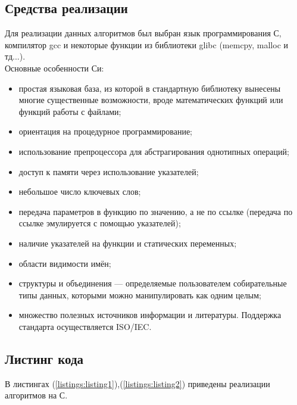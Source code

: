 \documentclass[a4paper,12pt]{article}
\begin{document}
\newpage
\subsection{Средства реализации}
Для реализации данных алгоритмов был выбран язык программирования С, компилятор gcc и некоторые функции из библиотеки glibc (memcpy, malloc и тд...). \\
Основные особенности Си:
\begin{itemize}
\item простая языковая база, из которой в стандартную библиотеку вынесены многие существенные возможности, вроде математических функций или функций работы с файлами;
\item ориентация на процедурное программирование;
\item использование препроцессора для абстрагирования однотипных операций;
\item доступ к памяти через использование указателей;
\item небольшое число ключевых слов;
\item передача параметров в функцию по значению, а не по ссылке (передача по ссылке эмулируется с помощью указателей);
\item наличие указателей на функции и статических переменных;
\item области видимости имён;
\item структуры и объединения — определяемые пользователем собирательные типы данных, которыми можно манипулировать как одним целым;
\item множество полезных источников информации и литературы. Поддержка стандарта осуществляется ISO/IEC.
\end{itemize}

\newpage
\subsection{Листинг кода}
В листингах (\ref{listings:listing1}),(\ref{listings:listing2}) приведены реализации алгоритмов на С.\\

\newpage

\end{document}
